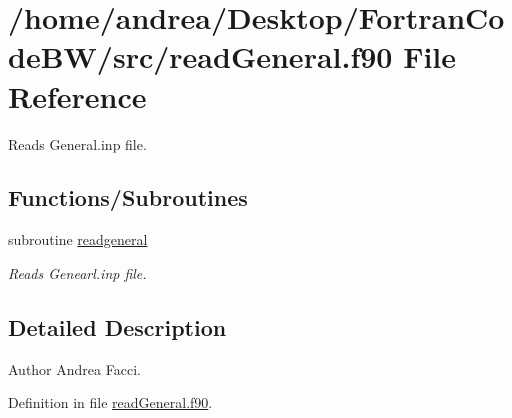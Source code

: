 \hypertarget{read_general_8f90}{\section{/home/andrea/\-Desktop/\-Fortran\-Code\-B\-W/src/read\-General.f90 File Reference}
\label{read_general_8f90}
}


Reads General.\-inp file.  


\subsection*{Functions/\-Subroutines}
\begin{DoxyCompactItemize}
\item 
subroutine \hyperlink{read_general_8f90_a7f63c840fdfc061f2289fb0106adc2d0}{readgeneral}
\begin{DoxyCompactList}\small\item\em Reads Genearl.\-inp file. \end{DoxyCompactList}\end{DoxyCompactItemize}


\subsection{Detailed Description}
\begin{DoxyAuthor}{Author}
Andrea Facci. 
\end{DoxyAuthor}


Definition in file \hyperlink{read_general_8f90_source}{read\-General.\-f90}.



